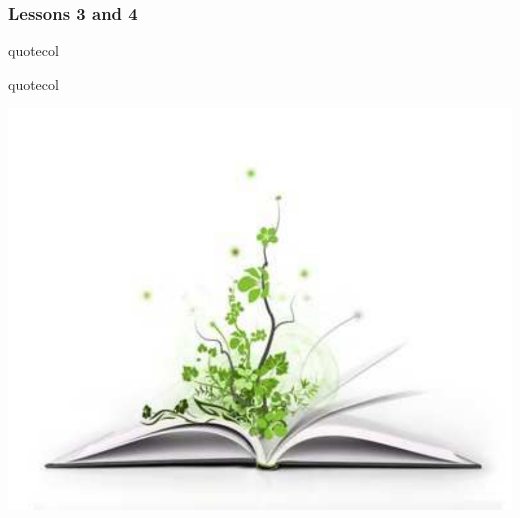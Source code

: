 
\begin{frame}
  \MadLogo
  \frametitle{Lessons 3 and 4}

\vfill
\begin{beamercolorbox}[wd=\textwidth,center]{quotecol}
\Large {}
\end{beamercolorbox}
\vfill
\begin{beamercolorbox}[wd=\textwidth,center]{quotecol}
\Large {}
\end{beamercolorbox}
\begin{center}
\includegraphics[height=0.33\textheight]{Fig/books}
\end{center}

\end{frame}

